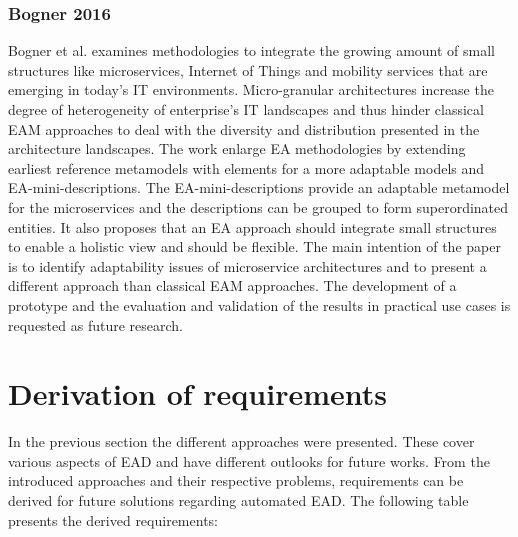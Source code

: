 \subsubsection{Bogner 2016}
Bogner et al. \cite{Bogner2016} examines methodologies to integrate the growing amount of small structures like microservices, Internet of Things and mobility services that are emerging in today's IT environments. Micro-granular architectures increase the degree of heterogeneity of enterprise's IT landscapes and thus hinder classical EAM approaches to deal with the diversity and distribution presented in the architecture landscapes. The work enlarge EA methodologies by extending earliest reference metamodels with elements for a more adaptable models and EA-mini-descriptions. The EA-mini-descriptions provide an adaptable metamodel for the microservices and the descriptions can be grouped to form superordinated entities. It also proposes that an EA approach should integrate small structures to enable a holistic view and should be flexible. The main intention of the paper is to identify adaptability issues of microservice architectures and to present a different approach than classical EAM approaches. The development of a prototype and the evaluation and validation of the results in practical use cases is requested as future research.

\section{Derivation of requirements}\label{subsection:derivationofrequirements}

In the previous section the different approaches were presented. These cover various aspects of EAD and have different outlooks for future works. From the introduced approaches and their respective problems, requirements can be derived for future solutions regarding automated EAD. The following table presents the derived requirements:

